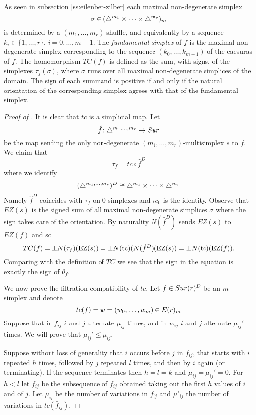 As seen in subsection \ref{ss:eilenber-zilber}
each maximal non-degenerate simplex  $$\sigma\in (\triangle^{m_1 }\times\dots\times\triangle^{m_r})_m $$ is  determined by a
$(m_1,\dots,m_r)$-shuffle, and equivalently by a sequence $k_i\in \{1,\dots ,r \}$, $i=0,\dots , m-1$.
The \textit{fundamental simplex} of $f$ is the
maximal non-degenerate simplex corresponding to the  sequence $(k_0,\dots, k_{m-1})$ of the caesuras of $f$.
The homomorphism $TC(f)$ is defined as the sum, with signs, of the simplexes
$\tau_f(\sigma)$, where $\sigma$ runs
over all maximal non-degenerate simplices of the domain. The sign of each summand is positive if and only if the natural orientation of the corresponding simplex agrees with that of the fundamental simplex.

\begin{proof}[Proof of ]
	It is clear that $tc$ is a simplicial map.
	Let
	\[
	\hat{f} \colon \triangle^{m_1,\dots,m_r} \to Sur
	\]
	be the map sending the only non-degenerate $(m_1,\dots,m_r)$-multisimplex $s$ to $f$. We claim that $$\tau_f = tc \circ \hat{f}^D$$ where we identify $$(\triangle^{m_1,\dots,m_r})^D \cong \triangle^{m_1}\times\dots\times\triangle^{m_r}$$  %
	Namely $\hat{f}^D$ coincides with $\tau_f$ on 0-simplexes and $tc_0$ is the identity.
	Observe that $EZ(s)$ is the signed sum of all maximal non-degenerate simplices $\sigma$ where the sign takes care of the orientation.
	By naturality $N(\hat{f}^D)$ sends $EZ(s)$ to $EZ(f)$ and so
	\[
	TC(f) = \pm N(\tau_f)(\operatorname{EZ}(s)) = \pm N(\operatorname{tc})(N(\hat{f}^D)(\operatorname{EZ}(s)) = \pm N(\operatorname{tc}) (\operatorname{EZ}(f)).
	\]
	Comparing with the definition of $TC$ we see that the sign in the equation is exactly the sign of $\theta_f$.

	We now prove the filtration compatibility of $tc$. Let $f\in Sur(r)^{D}$ be an $m$-simplex and denote $$tc(f)=w=(w_{0},\dots,w_{m})\in E(r)_{m}$$ Suppose that in $f_{ij}$ $i$ and $j$ alternate $\mu_{ij}$ times, and in $w_{ij}$ $i$ and $j$ alternate $\mu_{ij}'$ times.
	We will prove that
	$\mu_{ij}' \leq \mu_{ij}$.

	Suppose without loss of generality that $i$ occurs before $j$ in $f_{ij}$, that starts with $i$ repeated $h$ times, followed by $j$ repeated $l$ times, and then by $i$ again (or terminating).
	If the sequence terminates then $h=l=k$ and $\mu_{ij}=\mu_{ij}'=0$.
	For $h <l$ let $\bar{f}_{ij}$ be the subsequence of $f_{ij}$ obtained taking out the first $h$ values of $i$ and of $j$.
	Let $\bar{\mu}_{ij}$ be the number of variations in $\bar{f}_{ij}$
	and $\bar{\mu}'_{ij}$ the number of variations in $tc(\bar{f}_{ij})$.


\end{proof}
